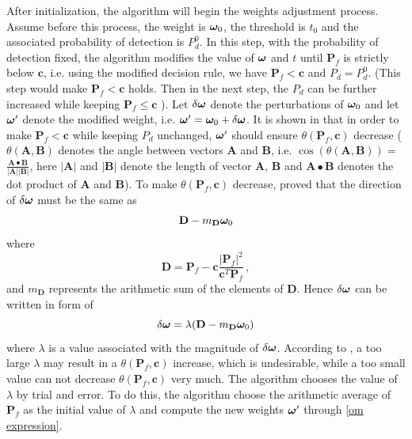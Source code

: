 After initialization, the algorithm will begin the weights adjustment process. 
Assume before this process, the weight is $\boldsymbol{\omega}_0$, the threshold is $t_0$ and the associated probability of detection is $P_d^0$.
In this step, with the probability of detection fixed, the algorithm modifies the value of $\boldsymbol{\omega}$ and $t$ until $\mathbf{P}_f$ is strictly below $ \mathbf{c}$, i.e. using the modified decision rule, we have $\mathbf{P}_f < \mathbf{c}$ and $P_d = P_d^0$. (This step would make $\mathbf{P}_f < \mathbf{c}$ holds. Then in the next step, the $P_d$ can be further increased while keeping $\mathbf{P}_f \leq \mathbf{c}$ \cite{zhang2000efficient}). 
Let $\delta\boldsymbol{\omega}$ denote the perturbations of $\boldsymbol{\omega}_0$ and let $\boldsymbol{\omega}'$ denote the modified weight, i.e. $\boldsymbol{\omega}' = \boldsymbol{\omega}_0 + \delta\boldsymbol{\omega}$.  It is shown in \cite{zhang2000efficient} that in order to make $\mathbf{P}_f < \mathbf{c}$ while keeping $P_d$ unchanged, $\boldsymbol{\omega}'$ should ensure $\theta(\mathbf{P}_f, \mathbf{c})$ decrease ($\theta(\mathbf{A}, \mathbf{B})$ denotes the angle between vectors $\mathbf{A}$ and $\mathbf{B}$, i.e. 
$\cos (\theta(\mathbf{A}, \mathbf{B})) =$ 
$\frac{\mathbf{A}\bullet \mathbf{B}}{|\mathbf{A}||\mathbf{B}|}$,
here $|\mathbf{A}|$ and $|\mathbf{B}|$ denote the length of vector $\mathbf{A}$, $\mathbf{B}$ and $\mathbf{A}\bullet \mathbf{B}$ denotes the dot product of $\mathbf{A}$ and $\mathbf{B}$). To make $\theta(\mathbf{P}_f, \mathbf{c})$ decrease, \cite{zhang2000efficient} proved that the direction of $\delta\boldsymbol{\omega}$ must be the same as
\begin{equation}
\label{direction}
\mathbf{D} - m_\mathbf{D}\boldsymbol{\omega}_0
\end{equation}
where 
\[
\mathbf{D} = \mathbf{P}_f - \mathbf{c}\frac{|\mathbf{P}_f|^2}{\mathbf{c}^T\mathbf{P}_f}\,,
\]
and $m_{\mathbf{D}}$ represents the arithmetic sum of the elements of $\mathbf{D}$. Hence $\delta\boldsymbol{\omega}$ can be written in form of 
\begin{equation}
\label{om expression}
\delta\boldsymbol{\omega} = \lambda( \mathbf{D} - m_\mathbf{D}\boldsymbol{\omega}_0) 
\end{equation}
where $\lambda$ is a value associated with the magnitude of $\delta\boldsymbol{\omega}$.
According to \cite{zhang2000efficient}, a too large $\lambda$ may result in a  $\theta(\mathbf{P}_f, \mathbf{c})$ increase, which is undesirable, while a too small value can not decrease $\theta(\mathbf{P}_f, \mathbf{c})$ very much. The algorithm chooses the value of $\lambda$ by trial and error. To do this, the algorithm choose the arithmetic average of $\mathbf{P}_f$ as the initial value of $\lambda$ and compute the new weights $\boldsymbol{\omega}'$ through \eqref{om expression}. 
